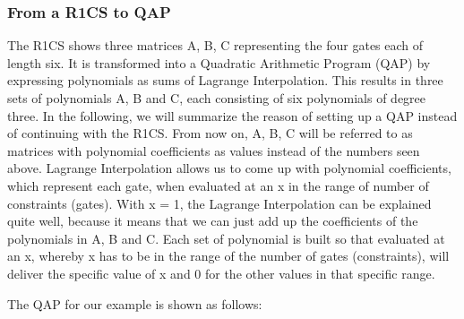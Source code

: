 \subsubsection{From a R1CS to QAP}

The R1CS shows three matrices A, B, C representing the four gates each of length six. It is transformed into a Quadratic Arithmetic Program (QAP) by expressing polynomials as sums of Lagrange Interpolation. This results in three sets of polynomials A, B and C, each consisting of six polynomials of degree three. In the following, we will summarize the reason of setting up a QAP instead of continuing with the R1CS. From now on, A, B, C will be referred to as matrices with polynomial coefficients as values instead of the numbers seen above. Lagrange Interpolation allows us to come up with polynomial coefficients, which represent each gate, when evaluated at an x in the range of number of constraints (gates). With x = 1, the Lagrange Interpolation can be explained quite well, because it means that we can just add up the coefficients of the polynomials in A, B and C. Each set of polynomial is built so that evaluated at an x, whereby x has to be in the range of the number of gates (constraints), will deliver the specific value of x and 0 for the other values in that specific range.

The QAP for our example is shown as follows:

